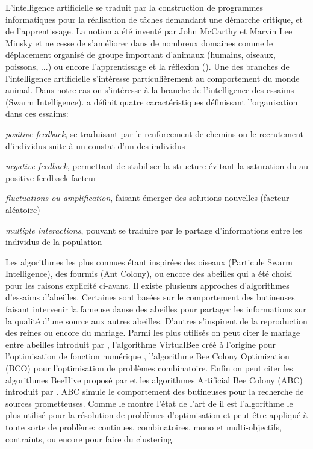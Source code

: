 L’intelligence artificielle se traduit par la construction de programmes informatiques
pour la réalisation de tâches demandant une démarche critique, et de l’apprentissage. La
notion a été inventé par John McCarthy et Marvin Lee Minsky et ne cesse de s’améliorer
dans de nombreux domaines comme le déplacement organisé de groupe important d’animaux (humains, oiseaux, poissons, ...)
ou encore l’apprentissage et la réflexion (\cite{Hsu199970,Silver2016484}).
Une des branches de l’intelligence artificielle s’intéresse particulièrement au comportement
du monde animal. Dans notre cas on s’intéresse à la branche de l’intelligence des
essaims (Swarm Intelligence). \cite{Bonabeau1999} a définit quatre caractéristiques
définissant l’organisation dans ces essaims:
\begin{description}
    \item \emph{positive feedback}, se traduisant par le renforcement de chemins ou le recrutement d’individus suite à un constat
          d’un des individus
    \item \emph{negative feedback}, permettant de stabiliser la structure évitant la saturation du au positive feedback facteur
    \item \emph{fluctuations ou amplification}, faisant émerger des solutions nouvelles (facteur aléatoire)
    \item \emph{multiple interactions}, pouvant se traduire par le partage d’informations entre les individus de la population
\end{description}
Les algorithmes les plus connues étant inspirées des oiseaux (Particule Swarm Intelligence),
des fourmis (Ant Colony), ou encore des abeilles qui a été choisi pour les raisons explicité ci-avant.
Il existe plusieurs approches d’algorithmes d’essaims d’abeilles. Certaines sont basées
sur le comportement des butineuses faisant intervenir la fameuse danse des abeilles pour partager
les informations sur la qualité d’une source aux autres abeilles. D’autres s’inspirent de la
reproduction des reines ou encore du mariage.
Parmi les plus utilisés on peut citer le mariage entre abeilles introduit par \cite{Abbass20011}, l’algorithme VirtualBee
créé à l’origine pour l’optimisation de fonction numérique \cite{Yang2005317}, l’algorithme Bee Colony Optimization (BCO)
\cite{Lucic2001441} pour l’optimisation de problèmes combinatoire. Enfin on peut citer les
algorithmes BeeHive proposé par \cite{Wedde200483} et les algorithmes Artificial Bee Colony (ABC) introduit par
\cite{Karaboga2005}. ABC simule le comportement des butineuses pour la recherche de sources prometteuses.
Comme le montre l’état de l’art de \cite{Karaboga201221} il est l’algorithme le plus
utilisé pour la résolution de problèmes d’optimisation et peut être appliqué à toute sorte de problème: continues,
combinatoires, mono et multi-objectifs, contraints, ou encore pour faire du clustering.

